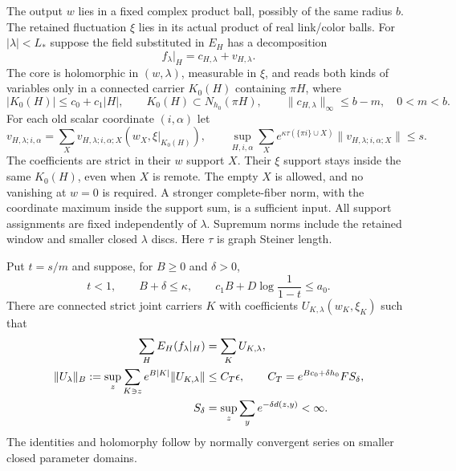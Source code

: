 The output $w$ lies in a fixed complex product ball, possibly
of the same radius $b$. The retained fluctuation $\xi$ lies in
its actual product of real link/color balls. For
$|\lambda|<L_*$ suppose the field substituted in $E_H$ has
a decomposition
\begin{equation}\label{cdj-core-tail}
 f_\lambda|_H=c_{H,\lambda}+v_{H,\lambda}.
\end{equation}
The core is holomorphic in $(w,\lambda)$, measurable in $\xi$,
and reads both kinds of variables only in a connected carrier
$K_0(H)$ containing $\pi H$, where
\begin{equation}\label{cdj-core-hypotheses}
 |K_0(H)|\le c_0+c_1|H|,\qquad
 K_0(H)\subset N_{h_0}(\pi H),\qquad
 \|c_{H,\lambda}\|_\infty\le b-m,\quad 0<m<b.
\end{equation}
For each old scalar coordinate $(i,\alpha)$ let
\begin{equation}\label{cdj-tail-family}
 v_{H,\lambda;i,\alpha}
   =\sum_Xv_{H,\lambda;i,\alpha;X}
                     (w_X,\xi|_{K_0(H)}),\qquad
 \sup_{H,i,\alpha}\sum_X
 e^{\kappa\tau(\{\pi i\}\cup X)}
       \|v_{H,\lambda;i,\alpha;X}\|\le s.
\end{equation}
The coefficients are strict in their $w$ support $X$.
Their $\xi$ support stays inside the same $K_0(H)$,
even when $X$ is remote. The empty $X$ is allowed, and
no vanishing at $w=0$ is required. A stronger complete-fiber
norm, with the coordinate maximum inside the support sum,
is a sufficient input. All support assignments are fixed
independently of $\lambda$. Supremum norms include the
retained window and smaller closed $\lambda$ discs.
Here $\tau$ is graph Steiner length.

\begin{theorem}\label{cdj-transport}
Put $t=s/m$ and suppose, for $B\ge0$ and $\delta>0$,
\begin{equation}\label{cdj-budget}
 t<1,\qquad B+\delta\le\kappa,\qquad
 c_1B+D\log\frac1{1-t}\le a_0.
\end{equation}
There are connected strict joint carriers $K$ with coefficients
$U_{K,\lambda}(w_K,\xi_K)$ such that
\begin{align}
 \sum_HE_H(f_\lambda|_H)&=\sum_KU_{K,\lambda},\notag\\
 \|U_\lambda\|_B
 :=\sup_z\sum_{K\ni z}e^{B|K|}\|U_{K,\lambda}\|
 &\le C_T\epsilon,\qquad
 C_T=e^{Bc_0+\delta h_0}F S_\delta,                     \label{cdj-transport-bound}\\
 S_\delta&=\sup_z\sum_y e^{-\delta d(z,y)}<\infty.\notag
\end{align}
The identities and holomorphy follow by normally convergent
series on smaller closed parameter domains.
\end{theorem}

